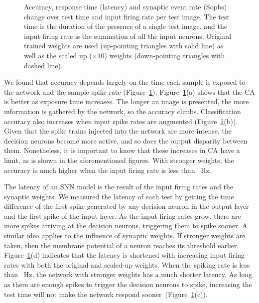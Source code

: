\begin{figure}[htb!]
	\caption{Accuracy, response time (latency) and synaptic event rate (Sopbs) change over test time and input firing rate per test image.
		The test time is the duration of the presence of a single test image, and the input firing rate is the summation of all the input neurons.
		Original trained weights are used (up-pointing triangles with solid line) as well as the scaled up ($\times10$) weights (down-pointing triangles with dashed line). }
	\label{fig:assess}
\end{figure}

We found that accuracy depends largely on the time each sample is exposed to the network and the sample spike rate (Figure~\ref{fig:assess}).
Figure~\ref{fig:assess}(a) shows that the CA is better as exposure time increases. The longer an image is presented, the more information is gathered by the network, so the accuracy climbs.
Classification accuracy also increases when input spike rates are augmented (Figure~\ref{fig:assess}(b)).
Given that the spike trains injected into the network are more intense, the decision neurons become more active, and so does the output disparity between them.
Nonetheless, it is important to know that these increases in CA have a limit, as is shown in the aforementioned figures.
With stronger weights, the accuracy is much higher when the input firing rate is less than \DIFdelbegin {}\DIFdelend \DIFaddbegin {}\DIFaddend ~Hz.


The latency of an SNN model is the result of the input firing rates and the synaptic weights.
We measured the latency of each test by getting the time difference of the first spike generated by any decision neuron in the output layer and the first spike of the input layer.
As the input firing rates grow, there are more spikes arriving at the decision neurons, triggering them to spike sooner.
A similar idea applies to the influence of synaptic weights.
If stronger weights are taken, then the membrane potential of a neuron reaches its threshold earlier.
Figure~\ref{fig:assess}(d) indicates that the latency is shortened with increasing input firing rates with both the original and scaled-up weights.
When the spiking rate is less than \DIFdelbegin {}\DIFdelend \DIFaddbegin {}\DIFaddend ~Hz, the network with stronger weights has a much shorter latency.
As long as there are enough spikes to trigger the decision neurons to spike, increasing the test time will not make the network respond sooner~(Figure~\ref{fig:assess}(c)).

